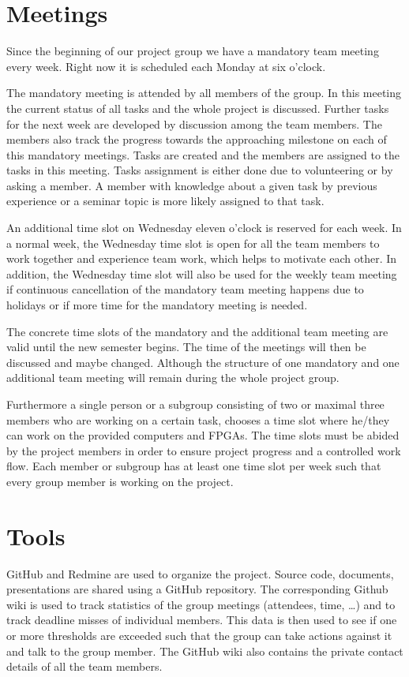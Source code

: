 \section{Meetings}
Since the beginning of our project group we have a mandatory team meeting every week.
Right now it is scheduled each Monday at six o'clock. 

The mandatory meeting is attended by all members of the group.
In this meeting the current status of all tasks and the whole project is discussed.
Further tasks for the next week are developed by discussion among the team members.
The members also track the progress towards the approaching milestone on each of this mandatory meetings.
Tasks are created and the members are assigned to the tasks in this meeting. Tasks assignment is either done due to volunteering or by asking a member.
A member with knowledge about a given task by previous experience or a seminar topic is more likely assigned to that task.

An additional time slot on Wednesday eleven o'clock is reserved for each week.
In a normal week, the Wednesday time slot is open for all the team members to work together and experience team work, which helps to motivate each other.
In addition, the Wednesday time slot will also be used for the weekly team meeting if continuous cancellation of the mandatory team meeting happens due to holidays
or if more time for the mandatory meeting is needed.

The concrete time slots of the mandatory and the additional team meeting are valid until the new semester begins. The time of the meetings will then be discussed and maybe changed. Although the structure of one mandatory and one additional team meeting will remain during the whole project group.

Furthermore a single person or a subgroup consisting of two or maximal three members who are working on a certain task, chooses a time slot where he/they can work on the provided computers and \acp{FPGA}.
The time slots must be abided by the project members in order to ensure project progress and a controlled work flow.
Each member or subgroup has at least one time slot per week such that every group member is working on the project.

\section{Tools}

GitHub and Redmine are used to organize the project.
Source code, documents, presentations are shared using a GitHub repository.
The corresponding Github wiki is used to track statistics of the group meetings (attendees, time, \dots) and to track deadline misses of individual members.
This data is then used to see if one or more thresholds are exceeded such that the group can take actions against it and talk to the group member.
The GitHub wiki also contains the private contact details of all the team members.

